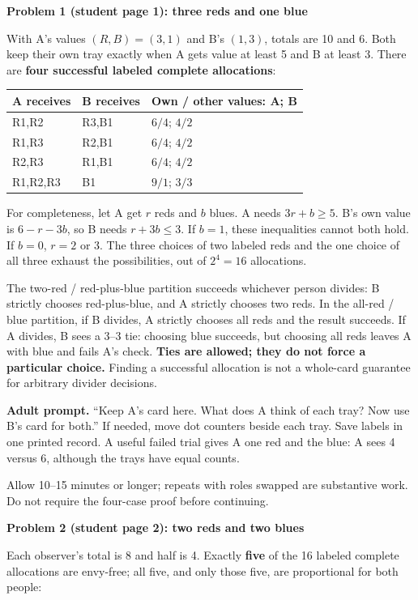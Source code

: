 \documentclass[11pt]{article}
\newcommand{\heading}[1]{\par\vspace{1.5mm}{\large\bfseries #1}\par\vspace{.8mm}}
\newcommand{\subhead}[1]{\par\vspace{1mm}\textbf{#1}\par}
\newcommand{\adult}[1]{\textbf{Adult prompt.} #1\par}
\newcommand{\page}[1]{\newpage\heading{#1}}
\begin{document}
\page{Problems 1 and 2: whole-card allocations}
\subhead{Problem 1 (student page 1): three reds and one blue}
With A's values $(R,B)=(3,1)$ and B's $(1,3)$, totals are 10 and 6. Both keep their own tray exactly when A gets value at least 5 and B at least 3. There are \textbf{four successful labeled complete allocations}:

\begin{tabularx}{\linewidth}{@{}L{31mm}L{33mm}X@{}}\toprule
A receives & B receives & Own / other values: A; B\\\midrule
R1,R2 & R3,B1 & $6/4$; $4/2$\\
R1,R3 & R2,B1 & $6/4$; $4/2$\\
R2,R3 & R1,B1 & $6/4$; $4/2$\\
R1,R2,R3 & B1 & $9/1$; $3/3$\\\bottomrule
\end{tabularx}

For completeness, let A get $r$ reds and $b$ blues. A needs $3r+b\ge5$. B's own value is $6-r-3b$, so B needs $r+3b\le3$. If $b=1$, these inequalities cannot both hold. If $b=0$, $r=2$ or 3. The three choices of two labeled reds and the one choice of all three exhaust the possibilities, out of $2^4=16$ allocations.

The two-red / red-plus-blue partition succeeds whichever person divides: B strictly chooses red-plus-blue, and A strictly chooses two reds. In the all-red / blue partition, if B divides, A strictly chooses all reds and the result succeeds. If A divides, B sees a $3$--$3$ tie: choosing blue succeeds, but choosing all reds leaves A with blue and fails A's check. \textbf{Ties are allowed; they do not force a particular choice.} Finding a successful allocation is not a whole-card guarantee for arbitrary divider decisions.

\adult{``Keep A's card here. What does A think of each tray? Now use B's card for both.'' If needed, move dot counters beside each tray. Save labels in one printed record. A useful failed trial gives A one red and the blue: A sees 4 versus 6, although the trays have equal counts.}

Allow 10--15 minutes or longer; repeats with roles swapped are substantive work. Do not require the four-case proof before continuing.

\subhead{Problem 2 (student page 2): two reds and two blues}
Each observer's total is 8 and half is 4. Exactly \textbf{five} of the 16 labeled complete allocations are envy-free; all five, and only those five, are proportional for both people:
\end{document}
